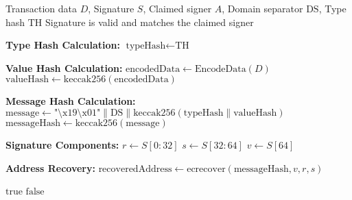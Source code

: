 \begin{protocol}
\label{prot:eip712-verification}
\begin{algorithmic}[1]
\Require Transaction data $D$, Signature $S$, Claimed signer $A$, Domain separator $\text{DS}$, Type hash $\text{TH}$
\Ensure Signature is valid and matches the claimed signer

\State \textbf{Type Hash Calculation:}
\State $\text{typeHash} \gets \text{TH}$

\State \textbf{Value Hash Calculation:}
\State $\text{encodedData} \gets \text{EncodeData}(D)$
\State $\text{valueHash} \gets \text{keccak256}(\text{encodedData})$

\State \textbf{Message Hash Calculation:}
\State $\text{message} \gets \text{"\textbackslash x19\textbackslash x01"} \parallel \text{DS} \parallel \text{keccak256}(\text{typeHash} \parallel \text{valueHash})$
\State $\text{messageHash} \gets \text{keccak256}(\text{message})$

\State \textbf{Signature Components:}
\State $r \gets S[0:32]$
\State $s \gets S[32:64]$
\State $v \gets S[64]$

\State \textbf{Address Recovery:}
\State $\text{recoveredAddress} \gets \text{ecrecover}(\text{messageHash}, v, r, s)$

    \State \Return $\text{true}$
\Else
    \State \Return $\text{false}$
\EndIf
\end{algorithmic}
\end{protocol}
